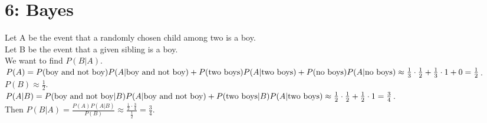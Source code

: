 \documentclass{article}
\begin{document}
\section*{6: Bayes}
Let A be the event that a randomly chosen child among two is a boy.
\\Let B be the event that a given sibling is a boy.
\\We want to find $P(B|A)$.
\\$P(A)
= P(\text{boy and not boy})
  P(A|\text{boy and not boy})
\\+ P(\text{two boys})
  P(A|\text{two boys})
\\+ P(\text{no boys})
  P(A|\text{no boys})
\\\approx \frac{1}{3} \cdot \frac{1}{2}
        + \frac{1}{3} \cdot 1
        + 0
= \frac{1}{2}$.
\\$P(B) \approx \frac{1}{2}$.
\\$P(A|B) = 
  P(\text{boy and not boy}|B)
  P(A|\text{boy and not boy})
+ P(\text{two boys}|B)
  P(A|\text{two boys})
\\\approx \frac{1}{2} \cdot \frac{1}{2}
        + \frac{1}{2} \cdot 1
= \frac{3}{4}$.
\\Then $P(B|A)
= \frac{P(A)P(A|B)}{P(B)}
\approx \displaystyle\frac{\frac{1}{2} \cdot \frac{3}{4}}{\frac{1}{2}}
= \frac{3}{4}$.
\end{document}
